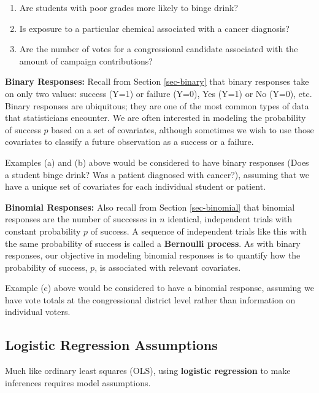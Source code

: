 \documentclass[
]{krantz}
\providecommand{\tightlist}{%
  \setlength{\itemsep}{0pt}\setlength{\parskip}{0pt}}
\begin{document}
\begin{enumerate}
\def\labelenumi{\alph{enumi}.}
\tightlist
\item
  Are students with poor grades more likely to binge drink?
\item
  Is exposure to a particular chemical associated with a cancer diagnosis?
\item
  Are the number of votes for a congressional candidate associated with the amount of campaign contributions?
\end{enumerate}

\textbf{Binary Responses:} Recall from Section \ref{sec-binary} that binary responses take on only two values: success (Y=1) or failure (Y=0), Yes (Y=1) or No (Y=0), etc. Binary responses are ubiquitous; they are one of the most common types of data that statisticians encounter. We are often interested in modeling the probability of success \(p\) based on a set of covariates, although sometimes we wish to use those covariates to classify a future observation as a success or a failure.

Examples (a) and (b) above would be considered to have binary responses (Does a student binge drink? Was a patient diagnosed with cancer?), assuming that we have a unique set of covariates for each individual student or patient.

\textbf{Binomial Responses:} Also recall from Section \ref{sec-binomial} that binomial responses are the number of successes in \(n\) identical, independent trials with constant probability \(p\) of success. A sequence of independent trials like this with the same probability of success is called a \textbf{Bernoulli process}.  As with binary responses, our objective in modeling binomial responses is to quantify how the probability of success, \(p\), is associated with relevant covariates.

Example (c) above would be considered to have a binomial response, assuming we have vote totals at the congressional district level rather than information on individual voters.

\subsection{Logistic Regression Assumptions}\label{logistic-regression-assumptions}

Much like ordinary least squares (OLS), using \textbf{logistic regression}  to make inferences requires model assumptions.
\end{document}
